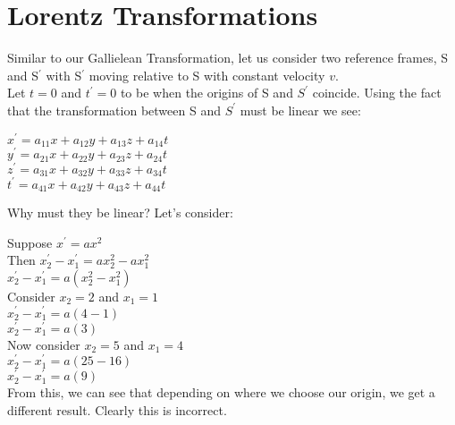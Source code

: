 \documentclass[a4paper]{article}
\begin{document}
\section{Lorentz Transformations}
Similar to our Gallielean Transformation, let us consider two reference frames, S and S$^\prime$ with S$^\prime$ moving relative to S with constant velocity $v$. \\
Let $t=0$ and $t^\prime =0$ to be when the origins of S and $S^\prime$ coincide.
Using the fact that the transformation between S and $S^\prime$ must be linear we see:
\begin{center}

$ x^\prime = a_{11}x + a_{12}y + a_{13}z + a_{14}t$\\
$ y^\prime = a_{21}x + a_{22}y + a_{23}z + a_{24}t$\\
$ z^\prime = a_{31}x + a_{32}y + a_{33}z + a_{34}t$\\
$ t^\prime = a_{41}x + a_{42}y + a_{43}z + a_{44}t$\\
\end{center}
Why must they be linear? Let's consider:

Suppose $x^\prime = ax^2$\\
Then $x_2^\prime - x_1^\prime = ax_2^2 - ax_1^2$\\
$x_2^\prime - x_1^\prime = a(x_2^2 - x_1^2)$\\
Consider $x_2 = 2$ and $x_1 = 1$\\
$x_2^\prime - x_1^\prime = a(4 - 1)$\\
$x_2^\prime - x_1^\prime = a(3)$\\
Now consider $x_2 = 5$ and $x_1 = 4$\\
$x_2^\prime - x_1^\prime = a(25 - 16)$\\
$x_2^\prime - x_1^\prime = a(9)$\\

From this, we can see that depending on where we choose our origin, we get a different result. Clearly this is incorrect.
\end{document}

